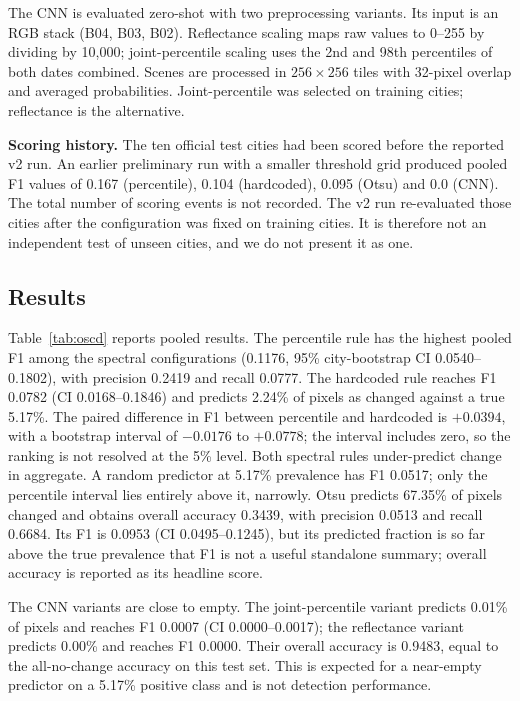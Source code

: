 \documentclass[conference]{IEEEtran}
\begin{document}
The CNN is evaluated zero-shot with two preprocessing variants. Its input is an
RGB stack (B04, B03, B02). Reflectance scaling maps raw values to 0--255 by
dividing by 10,000; joint-percentile scaling uses the 2nd and 98th percentiles of
both dates combined. Scenes are processed in $256\times256$ tiles with 32-pixel
overlap and averaged probabilities. Joint-percentile was selected on training
cities; reflectance is the alternative.

\textbf{Scoring history.} The ten official test cities had been scored before
the reported v2 run. An earlier preliminary run with a smaller threshold grid
produced pooled F1 values of 0.167 (percentile), 0.104 (hardcoded), 0.095
(Otsu) and 0.0 (CNN). The total number of scoring events is not recorded. The v2
run re-evaluated those cities after the configuration was fixed on training
cities. It is therefore not an independent test of unseen cities, and we do not
present it as one.

\subsection{Results}
Table~\ref{tab:oscd} reports pooled results. The percentile rule has the highest
pooled F1 among the spectral configurations (0.1176, 95\% city-bootstrap CI
0.0540--0.1802), with precision 0.2419 and recall 0.0777. The hardcoded rule
reaches F1 0.0782 (CI 0.0168--0.1846) and predicts 2.24\% of pixels as changed
against a true 5.17\%. The paired difference in F1 between percentile and
hardcoded is $+0.0394$, with a bootstrap interval of $-0.0176$ to $+0.0778$;
the interval includes zero, so the ranking is not resolved at the 5\% level.
Both spectral rules under-predict change in aggregate. A random predictor at
5.17\% prevalence has F1 0.0517; only the percentile interval lies entirely
above it, narrowly.
Otsu predicts 67.35\% of pixels changed and obtains overall accuracy 0.3439,
with precision 0.0513 and recall 0.6684. Its F1 is 0.0953 (CI 0.0495--0.1245),
but its predicted fraction is so far above the true prevalence that F1 is not a
useful standalone summary; overall accuracy is reported as its headline score.

The CNN variants are close to empty. The joint-percentile variant predicts 0.01\%
of pixels and reaches F1 0.0007 (CI 0.0000--0.0017); the reflectance variant
predicts 0.00\% and reaches F1 0.0000. Their overall accuracy is 0.9483, equal to
the all-no-change accuracy on this test set. This is expected for a near-empty
predictor on a 5.17\% positive class and is not detection performance.
\end{document}
